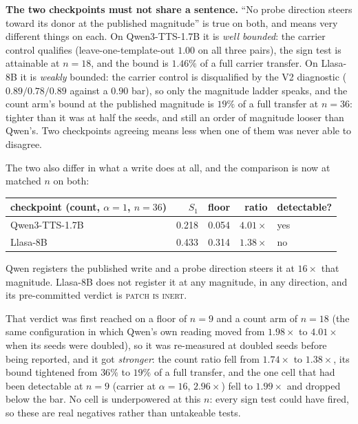 \documentclass[11pt]{article}
\begin{document}
\textbf{The two checkpoints must not share a sentence.} ``No probe direction
steers toward its donor at the published magnitude'' is true on both, and means
very different things on each. On Qwen3-TTS-1.7B it is \emph{well bounded}: the
carrier control qualifies (leave-one-template-out $1.00$ on all three pairs), the
sign test is attainable at $n{=}18$, and the bound is $1.46\%$ of a full carrier
transfer. On Llasa-8B it is \emph{weakly} bounded: the carrier control is
disqualified by the V2 diagnostic ($0.89 / 0.78 / 0.89$ against a $0.90$ bar), so
only the magnitude ladder speaks, and the count arm's bound at the published
magnitude is $19\%$ of a full transfer at $n{=}36$: tighter than it was at
half the seeds, and still an order of magnitude looser than Qwen's. Two checkpoints agreeing means less when one of them
was never able to disagree.

The two also differ in what a write does at all, and the comparison is now at
matched $n$ on both:

\begin{center}
\begin{tabular}{@{}lrrrl@{}}
\toprule
checkpoint (count, $\alpha{=}1$, $n{=}36$) & $S_1$ & floor & ratio & detectable? \\
\midrule
Qwen3-TTS-1.7B & 0.218 & 0.054 & $4.01\times$ & yes \\
Llasa-8B       & 0.433 & 0.314 & $1.38\times$ & no \\
\bottomrule
\end{tabular}
\end{center}

\noindent Qwen registers the published write and a probe direction steers it at
$16\times$ that magnitude. Llasa-8B does not register it at any magnitude, in any
direction, and its pre-committed verdict is \textsc{patch is inert}.

That verdict was first reached on a floor of $n{=}9$ and a count arm of $n{=}18$
(the same configuration in which Qwen's own reading moved from $1.98\times$ to
$4.01\times$ when its seeds were doubled), so it was re-measured at doubled
seeds before being reported, and it got \emph{stronger}: the count ratio fell
from $1.74\times$ to $1.38\times$, its bound tightened from $36\%$ to $19\%$ of a
full transfer, and the one cell that had been detectable at $n{=}9$ (carrier at
$\alpha{=}16$, $2.96\times$) fell to $1.99\times$ and dropped below the bar. No
cell is underpowered at this $n$: every sign test could have fired, so these are
real negatives rather than untakeable tests.
\end{document}
